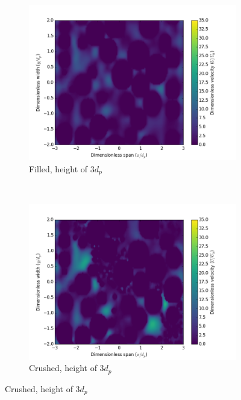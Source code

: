 \begin{figure}[!ht]
    \begin{subfigure}[b]{0.44\textwidth}
        \includegraphics[width = \textwidth]{figures/lbm/cross-sections-filled/contour-60}
        \caption{Filled, height of $3d_p$}\label{fig:lbm-contours-filled-60}
    \end{subfigure}
    ~
    \begin{subfigure}[b]{0.44\textwidth}
        \includegraphics[width = \textwidth]{figures/lbm/cross-sections-crushed/contour-60}
        \caption{Crushed, height of $3d_p$}\label{fig:lbm-contours-crushed-60}
    \end{subfigure}


\end{figure}
